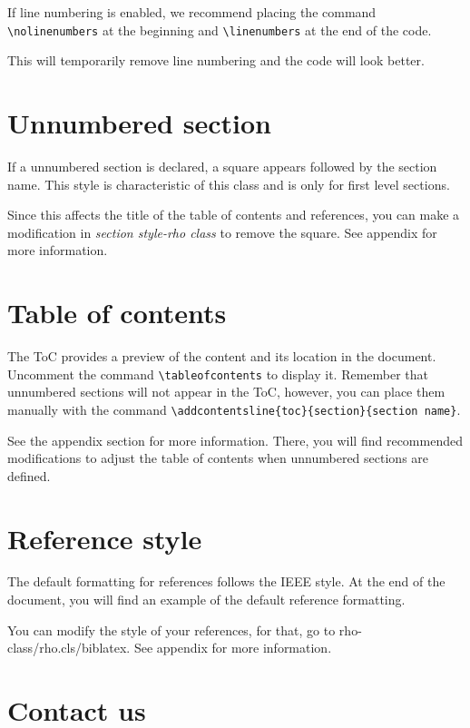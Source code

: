 \documentclass[9pt,a4paper,twoside]{rho-class/rho}
\begin{document}
    \linenumbers
    
    If line numbering is enabled, we recommend placing the command \verb|\nolinenumbers| at the beginning and \verb|\linenumbers| at the end of the code. 
    
    This will temporarily remove line numbering and the code will look better.

\section*{Unnumbered section} \label{sec:unsec}

    If a unnumbered section is declared, a square appears followed by the section name. This style is characteristic of this class and is only for first level sections.

    Since this affects the title of the table of contents and references, you can make a modification in \textit{section style-rho class} to remove the square. See appendix for more information.

\section{Table of contents}

    The ToC provides a preview of the content and its location in the document. Uncomment the command \verb|\tableofcontents| to display it. Remember that unnumbered sections will not appear in the ToC, however, you can place them manually with the command \verb|\addcontentsline{toc}{section}{section name}|.

    See the appendix section for more information. There, you will find recommended modifications to adjust the table of contents when unnumbered sections are defined.

\section{Reference style}

    The default formatting for references follows the IEEE style. At the end of the document, you will find an example of the default reference formatting.

    You can modify the style of your references, for that, go to rho-class/rho.cls/biblatex. See appendix for more information.

\section{Contact us}
\end{document}
